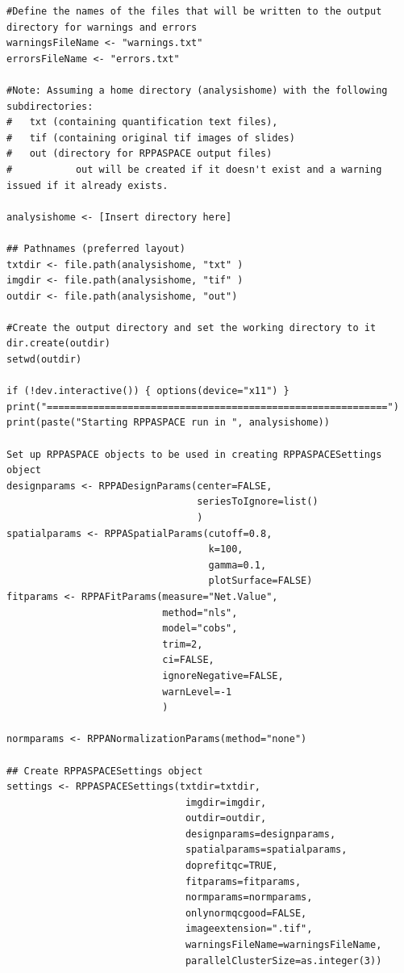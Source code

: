 \documentclass[
]{article}
\begin{document}
\begin{verbatim}
#Define the names of the files that will be written to the output directory for warnings and errors 
warningsFileName <- "warnings.txt"
errorsFileName <- "errors.txt"

#Note: Assuming a home directory (analysishome) with the following subdirectories:
#   txt (containing quantification text files),
#   tif (containing original tif images of slides)
#   out (directory for RPPASPACE output files)
#           out will be created if it doesn't exist and a warning issued if it already exists.

analysishome <- [Insert directory here]

## Pathnames (preferred layout)
txtdir <- file.path(analysishome, "txt" )
imgdir <- file.path(analysishome, "tif" )
outdir <- file.path(analysishome, "out")

#Create the output directory and set the working directory to it
dir.create(outdir)
setwd(outdir)

if (!dev.interactive()) { options(device="x11") }
print("===========================================================")
print(paste("Starting RPPASPACE run in ", analysishome))

Set up RPPASPACE objects to be used in creating RPPASPACESettings object
designparams <- RPPADesignParams(center=FALSE,
                                 seriesToIgnore=list()
                                 )
spatialparams <- RPPASpatialParams(cutoff=0.8,
                                   k=100,
                                   gamma=0.1,
                                   plotSurface=FALSE)
fitparams <- RPPAFitParams(measure="Net.Value",
                           method="nls",
                           model="cobs",
                           trim=2,
                           ci=FALSE,
                           ignoreNegative=FALSE,
                           warnLevel=-1
                           )

normparams <- RPPANormalizationParams(method="none")    

## Create RPPASPACESettings object
settings <- RPPASPACESettings(txtdir=txtdir,
                               imgdir=imgdir,
                               outdir=outdir,
                               designparams=designparams,
                               spatialparams=spatialparams,
                               doprefitqc=TRUE,
                               fitparams=fitparams,
                               normparams=normparams,
                               onlynormqcgood=FALSE,
                               imageextension=".tif",
                               warningsFileName=warningsFileName,
                               parallelClusterSize=as.integer(3))


\end{verbatim}
\end{document}
